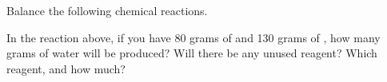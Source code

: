 \documentclass[10pt]{exam}
\begin{document}
\begin{questions}


\question Balance the following chemical reactions.


\question In the reaction above, if you have 80 grams of  and
130 grams of , how many grams of water will be produced?
Will there be any unused reagent?  Which reagent, and how much?

\end{questions}
\end{document}
